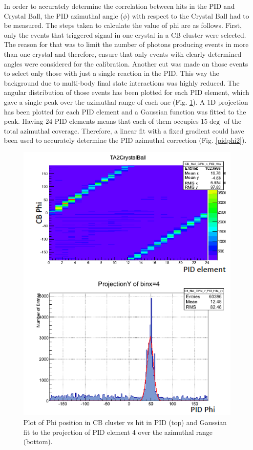 \indent In order to accurately determine the correlation between hits in the PID and Crystal Ball, the PID azimuthal angle ($\phi$) with respect to the Crystal Ball had to be measured. The steps taken to calculate the value of phi are as follows.
\indent First, only the events that triggered signal in one crystal in a CB cluster were selected. The reason for that was to limit the number of photons producing events in more than one crystal and therefore, ensure that only events with clearly determined angles were considered for the calibration. Another cut was made on those events to select only those with just a single reaction in the PID. This way the background due to multi-body final state interactions was highly reduced.
\indent The angular distribution of those events has been plotted for each PID element, which gave a single peak over the azimuthal range of each one (Fig. \ref{pidphi}). A 1D projection has been plotted for each PID element and a Gaussian function was fitted to the peak. Having 24 PID elements means that each of them occupies 15$\deg$ of the total azimuthal coverage. Therefore, a linear fit with a fixed gradient could have been used to accurately determine the PID azimuthal correction (Fig. \ref{pidphi2}).

\begin{figure}[H]
\begin{center}
\includegraphics[scale=0.55]{pidphi.png}
\caption{Plot of Phi position in CB cluster vs hit in PID (top) and Gaussian fit to the projection of PID element 4 over the azimuthal range (bottom).}
\label{pidphi}
\end{center}
\end{figure}

